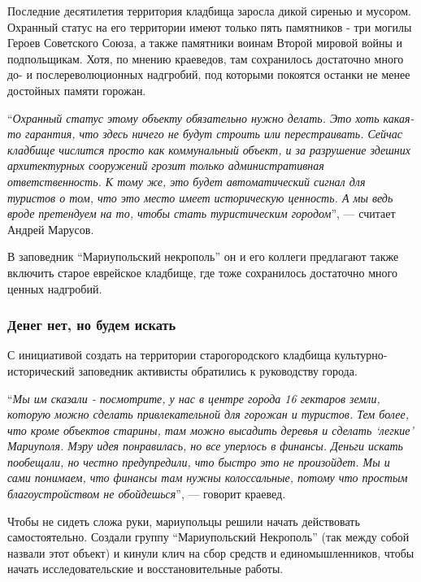 
Последние десятилетия территория кладбища заросла дикой сиренью и мусором.
Охранный статус на его территории имеют только пять памятников - три могилы
Героев Советского Союза, а также памятники воинам Второй мировой войны и
подпольщикам. Хотя, по мнению краеведов, там сохранилось достаточно много до- и
послереволюционных надгробий, под которыми покоятся останки не менее достойных
памяти горожан.

\enquote{\em Охранный статус этому объекту обязательно нужно делать. Это хоть какая-то
гарантия, что здесь ничего не будут строить или перестраивать. Сейчас кладбище
числится просто как коммунальный объект, и за разрушение здешних архитектурных
сооружений грозит только административная ответственность. К тому же, это будет
автоматический сигнал для туристов о том, что это место имеет историческую
ценность. А мы ведь вроде претендуем на то, чтобы стать туристическим городом},
— считает Андрей Марусов.

В заповедник \enquote{Мариупольский некрополь} он и его коллеги предлагают также
включить старое еврейское кладбище, где тоже сохранилось достаточно много
ценных надгробий.

\subsubsection{Денег нет, но будем искать}

С инициативой создать на территории старогородского кладбища
культурно-исторический заповедник активисты обратились к руководству города.

\enquote{\em Мы им сказали - посмотрите, у нас в центре города 16 гектаров земли, которую
можно сделать привлекательной для горожан и туристов. Тем более, что кроме
объектов старины, там можно высадить деревья и сделать \enquote{легкие} Мариуполя. Мэру
идея понравилась, но все уперлось в финансы. Деньги искать пообещали, но честно
предупредили, что быстро это не произойдет. Мы и сами понимаем, что финансы там
нужны колоссальные, потому что простым благоустройством не обойдешься}, —
говорит краевед.


Чтобы не сидеть сложа руки, мариупольцы решили начать действовать
самостоятельно. Создали группу \enquote{Мариупольский Некрополь} (так между
собой назвали этот объект) и кинули клич на сбор средств и единомышленников,
чтобы начать исследовательские и восстановительные работы.

